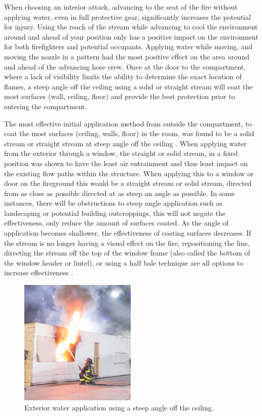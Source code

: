\documentclass[12pt,oneside]{book}
\begin{document}
When choosing an interior attack, advancing to the seat of the fire without applying water, even in full protective gear, significantly increases the potential for injury. Using the reach of the stream while advancing to cool the environment around and ahead of your position only has a positive impact on the environment for both firefighters and potential occupants. Applying water while moving, and moving the nozzle in a pattern had the most positive effect on the area around and ahead of the advancing hose crew. Once at the door to the compartment, where a lack of visibility limits the ability to determine the exact location of flames, a steep angle off the ceiling using a solid or straight stream will coat the most surfaces (wall, ceiling, floor) and provide the best protection prior to entering the compartment. 

The most effective initial application method from outside the compartment, to coat the most surfaces (ceiling, walls, floor) in the room, was found to be a solid stream or straight stream at steep angle off the ceiling \cite{Weinchenk_watermapping}. When applying water from the exterior through a window, the straight or solid stream, in a fixed position was shown to have the least air entrainment \cite{Weinchenk_airentrainment} and thus least impact on the existing flow paths within the structure. When applying this to a window or door on the fireground this would be a straight stream or solid stream, directed from as close as possible directed at as steep an angle as possible. In some instances, there will be obstructions to steep angle application such as landscaping or potential building outcroppings, this will not negate the effectiveness, only reduce the amount of surfaces coated. As the angle of application becomes shallower, the effectiveness of coating surfaces decreases. If the stream is no longer having a visual effect on the fire, repositioning the line, directing the stream off the top of the window frame (also called the bottom of the window header or lintel), or using a half bale technique are all options to increase effectiveness \cite{Weinchenk_watermapping}. 

\begin{figure}[H]
\centering
\includegraphics[width=0.495\textwidth]{../0_Images/Tactical_Considerations/Water_App_Direction/Exterior_Application.jpg}
\caption[Application Tactic - Exterior Attack]{Exterior water application using a steep angle off the ceiling.}
\label{fig:water_app_dir_TC_app_method}
\end{figure}
\end{document}
